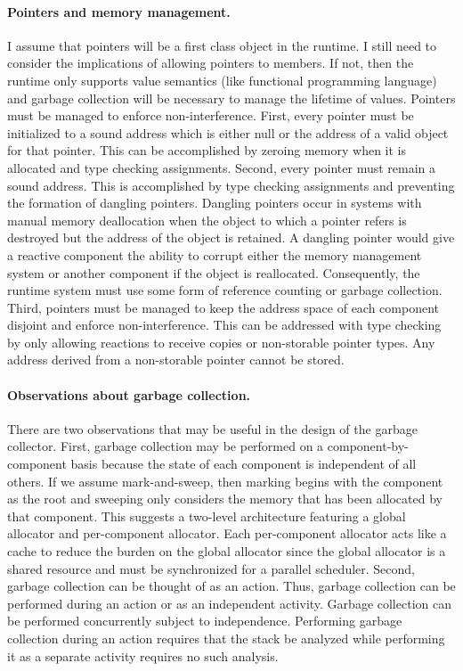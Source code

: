 \documentclass[letterpaper]{article}
\theoremstyle{definition} \newtheorem{constraint}{Constraint}
\begin{document}
\paragraph{Pointers and memory management.}
I assume that pointers will be a first class object in the runtime.
I still need to consider the implications of allowing pointers to members.
If not, then the runtime only supports value semantics (like functional programming language) and garbage collection will be necessary to manage the lifetime of values.
Pointers must be managed to enforce non-interference.
First, every pointer must be initialized to a sound address which is either null or the address of a valid object for that pointer.
This can be accomplished by zeroing memory when it is allocated and type checking assignments.
Second, every pointer must remain a sound address.
This is accomplished by type checking assignments and preventing the formation of dangling pointers.
Dangling pointers occur in systems with manual memory deallocation when the object to which a pointer refers is destroyed but the address of the object is retained.
A dangling pointer would give a reactive component the ability to corrupt either the memory management system or another component if the object is reallocated.
Consequently, the runtime system must use some form of reference counting or garbage collection.
Third, pointers must be managed to keep the address space of each component disjoint and enforce non-interference.
This can be addressed with type checking by only allowing reactions to receive copies or non-storable pointer types.
Any address derived from a non-storable pointer cannot be stored.

\paragraph{Observations about garbage collection.}
There are two observations that may be useful in the design of the garbage collector.
First, garbage collection may be performed on a component-by-component basis because the state of each component is independent of all others.
If we assume mark-and-sweep, then marking begins with the component as the root and sweeping only considers the memory that has been allocated by that component.
This suggests a two-level architecture featuring a global allocator and per-component allocator.
Each per-component allocator acts like a cache to reduce the burden on the global allocator since the global allocator is a shared resource and must be synchronized for a parallel scheduler.
Second, garbage collection can be thought of as an action.
Thus, garbage collection can be performed during an action or as an independent activity.
Garbage collection can be performed concurrently subject to independence.
Performing garbage collection during an action requires that the stack be analyzed while performing it as a separate activity requires no such analysis.
\end{document}
